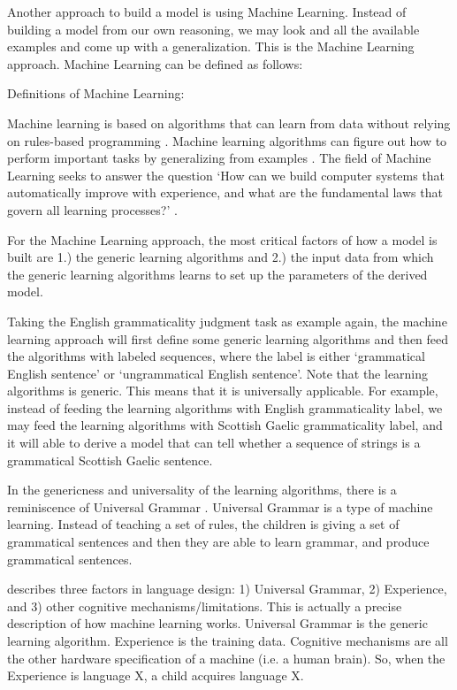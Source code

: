 Another approach to build a model is using Machine Learning. Instead of building a model from our own reasoning, we may look and all the available examples and come up with a generalization. This is the Machine Learning approach. 
Machine Learning can be defined as follows:

\begin{exe}
\ex Definitions of Machine Learning:
\begin{xlist}
	\ex Machine learning is based on algorithms that can learn from data without relying on rules-based programming \citep{pyle2015executive}. 
	\ex Machine learning algorithms can figure out how to perform important tasks by generalizing from examples \citep{domingos2012few}.
	\ex The field of Machine Learning seeks to answer the question `How can we build computer systems that automatically improve with experience, and what are the fundamental laws that govern all learning processes?' \citep{mitchell2006discipline}.
\end{xlist}
\end{exe}   

For the Machine Learning approach, the most critical factors of how a model is built are 1.) the generic learning algorithms and 2.) the input data from which the generic learning algorithms learns to set up the parameters of the derived model.  

Taking the English grammaticality judgment task as example again, the machine learning approach will first define some generic learning algorithms and then feed the algorithms with labeled sequences, where the label is either `grammatical English sentence' or `ungrammatical English sentence'. Note that the learning algorithms is generic. This means that it is universally applicable. For example, instead of feeding the learning algorithms with English grammaticality label, we may feed the learning algorithms with Scottish Gaelic grammaticality label, and it will able to derive a model that can tell whether a sequence of strings is a grammatical Scottish Gaelic sentence. 


In the genericness and universality of the learning algorithms, there is a reminiscence of Universal Grammar \citep{chomsky2007}. 
Universal Grammar is a type of machine learning. Instead of teaching a set of rules, the children is giving a set of grammatical sentences and then they are able to learn grammar, and produce grammatical sentences. 

\citet{chom2005_three_factors} describes three factors in language design: 1) Universal Grammar, 2) Experience, and 3) other cognitive mechanisms/limitations. This is actually a precise description of how machine learning works. Universal Grammar is the generic learning algorithm. Experience is the training data. Cognitive mechanisms are all the other hardware specification of a machine (i.e. a human brain). So, when the Experience is language X, a child acquires language X.  

